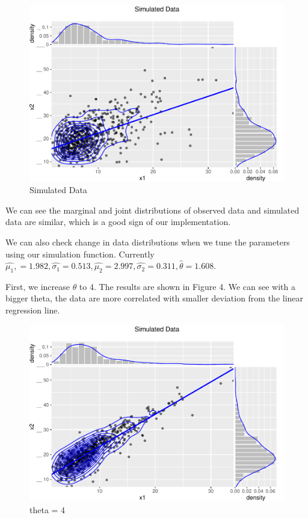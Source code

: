 \documentclass[11pt,]{article}
\begin{document}
\begin{figure}
\centering
\includegraphics{figs/unnamed-chunk-7.pdf}
\caption{Simulated Data}
\end{figure}

We can see the marginal and joint distributions of observed data and
simulated data are similar, which is a good sign of our implementation.

We can also check change in data distributions when we tune the
parameters using our simulation function. Currently
\(\hat{\mu_{1}},= 1.982, \hat{\sigma_{1}}=0.513,\hat{\mu_{2}}=2.997,\hat{\sigma_{2}}=0.311,\hat{\theta}=1.608\).

First, we increase \(\theta\) to 4. The results are shown in Figure 4.
We can see with a bigger theta, the data are more correlated with
smaller deviation from the linear regression line.

\begin{figure}
\centering
\includegraphics{figs/unnamed-chunk-8.pdf}
\caption{theta = 4}
\end{figure}
\end{document}
